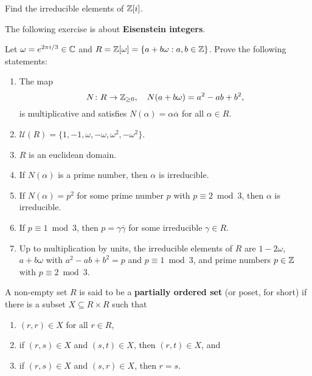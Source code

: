 \begin{exercise}
\label{xca:Z[i]irreducibles}
Find the irreducible elements of $\mathbb{Z}[i]$. 
\end{exercise}

The following exercise is about \textbf{Eisenstein integers}. 

\begin{exercise}
    \label{xca:Eisenstein}
    Let $\omega=e^{2\pi i/3}\in\mathbb{C}$ and $R=\mathbb{Z}[\omega]=\{a+b\omega:a,b\in\mathbb{Z}\}$. 
    Prove the following statements:
    \begin{enumerate}
        \item The map 
        \[
        N\colon R\to\mathbb{Z}_{\geq0},
        \quad
        N(a+b\omega)=a^2-ab+b^2,
        \]
        is multiplicative and 
        satisfies $N(\alpha)=\alpha\overline{\alpha}$
        for all $\alpha\in R$. 
        \item $\mathcal{U}(R)=\{1,-1,\omega,-\omega,\omega^2,-\omega^2\}$.
        \item $R$ is an euclidean domain.
        \item If $N(\alpha)$ is a prime number, then $\alpha$ is irreducible. 
        \item If $N(\alpha)=p^2$ for some 
            prime number $p$ with $p\equiv 2\bmod 3$, then 
            $\alpha$ is irreducible. 
        \item If $p\equiv 1\bmod 3$, then 
            $p=\gamma\overline{\gamma}$ for some 
            irreducible $\gamma\in R$.
        \item Up to multiplication by units, 
            the irreducible elements of $R$ are $1-2\omega$, 
            $a+b\omega$ with $a^2-ab+b^2=p$ and $p\equiv 1\bmod 3$, 
            and prime numbers $p\in\mathbb{Z}$ with $p\equiv 2\bmod 3$.
    \end{enumerate}
\end{exercise}


\begin{definition}
A non-empty set $R$ is said to be a \textbf{partially ordered set} (or poset, for short) 
if there is a subset $X\subseteq R\times R$ such that
\begin{enumerate}
    \item $(r,r)\in X$ for all $r\in R$, 
    \item if $(r,s)\in X$ and $(s,t)\in X$, then $(r,t)\in X$, and 
    \item if $(r,s)\in X$ and $(s,r)\in X$, then $r=s$. 
\end{enumerate}
\end{definition}

